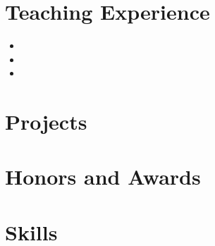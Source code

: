 \documentclass{resume}
\begin{document}

\section{Teaching Experience}

\begin{itemize}[nosep]
  \item 
  \item 
  \item 
\end{itemize}


\section{Projects}






\section{Honors and Awards}

\begin{enumerate}[label={[\arabic*]},nosep]
  \item 
  \item 
  \item 
  \item 
  \item 
\end{enumerate}


\section{Skills}


\end{document}
